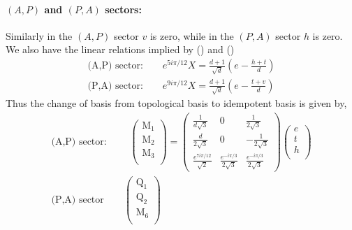 \documentclass[12pt,a4paper]{article}
\begin{document}
\paragraph{$(A,P)$ and $(P,A)$ sectors:}
Similarly in the $(A,P)$ sector $v$ is zero, while in the $(P,A)$ sector $h$ is zero. 
We also have the linear relations implied by () and ()
\begin{align}
\text{(A,P) sector:} \quad \quad e^{5i\pi /12} X = \frac{d+1}{\sqrt{d}}(e -\frac{h + t}{d})\\
\text{(P,A) sector:} \quad \quad e^{9i\pi /12} X = \frac{d+1}{\sqrt{d}}(e -\frac{t + v}{d})
\end{align}
Thus the change of basis from topological basis to idempotent basis is given by,
\begin{align}
\text{(A,P) sector: } \quad \quad \left( \begin{matrix}
\text{M}_1\\
\text{M}_2\\
\text{M}_3\\
\end{matrix} \right)
= \left( \begin{matrix}
\frac{1}{d\sqrt{3}} & 0 & \frac{1}{2 \sqrt{3}} \\
\frac{d}{2 \sqrt{3}} & 0 & - \frac{1}{2 \sqrt{3}} \\
\frac{e^{7 i \pi/12}}{\sqrt{2}} & \frac{e^{- i \pi/3}}{2\sqrt{3}} & \frac{e^{- i \pi/3}}{2 \sqrt{3}}
\end{matrix} \right)
\left( \begin{matrix}
e\\
t\\
h\\
\end{matrix} \right) \\
\text{(P,A) sector} \quad \quad  \left( \begin{matrix}
\text{Q}_1\\
\text{Q}_2\\
\text{M}_6\\
\end{matrix} \right)

\end{align}
\end{document}
